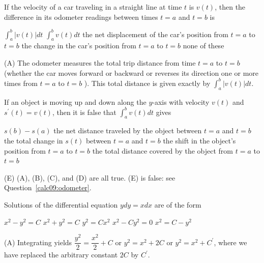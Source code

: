 \newpage


\question\label{calc09:odometer}
If the velocity of a car traveling in a straight line at time $t$ is $v(t)$, then the difference in its odometer readings between times $t=a$ and $t=b$ is
\begin{choices}
  \CorrectChoice $\int_{a}^{b}|v(t)| d t$
  \choice $\int_{a}^{b} v(t) d t$
  \choice the net displacement of the car's position from $t=a$ to $t=b$
  \choice the change in the car's position from $t=a$ to $t=b$
  \choice none of these
\end{choices}
\begin{solution}
(A) The odometer measures the total trip distance from time $t=a$ to $t=b$ (whether the car moves forward or backward or reverses its direction one or more times from $t=a$ to $t=b$ ). This total distance is given exactly by $\int_{a}^{b}|v(t)| d t$.
\end{solution}

\question
If an object is moving up and down along the $y$-axis with velocity $v(t)$ and $s^{\prime}(t)=v(t)$, then it is false that $\int_{a}^{b} v(t) d t$ gives
\begin{choices}
  \choice $s(b)-s(a)$
  \choice the net distance traveled by the object between $t=a$ and $t=b$
  \choice the total change in $s(t)$ between $t=a$ and $t=b$
  \choice the shift in the object's position from $t=a$ to $t=b$
  \CorrectChoice the total distance covered by the object from $t=a$ to $t=b$
\end{choices}
\begin{solution}
(E) (A), (B), (C), and (D) are all true. (E) is false: see Question~\ref{calc09:odometer}.
\end{solution}

\question\label{calc09:separable-ydyx}
Solutions of the differential equation $y d y=x d x$ are of the form
\begin{choices}
  \CorrectChoice $x^{2}-y^{2}=C$
  \choice $x^{2}+y^{2}=C$
  \choice $y^{2}=C x^{2}$
  \choice $x^{2}-C y^{2}=0$
  \choice $x^{2}=C-y^{2}$
\end{choices}
\begin{solution}
(A) Integrating yields $\dfrac{y^{2}}{2}=\dfrac{x^{2}}{2}+C$ or $y^{2}=x^{2}+2 C$ or $y^{2}=x^{2}+C^{\prime}$, where we have replaced the arbitrary constant $2 C$ by $C^{\prime}$.
\end{solution}


\newpage



